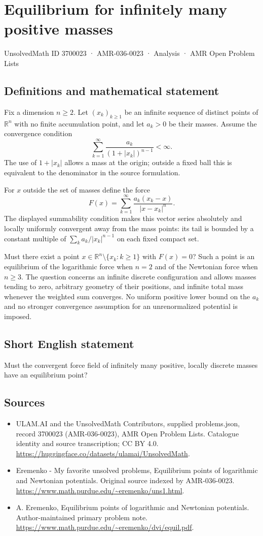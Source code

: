 \documentclass[11pt,a4paper]{article}
\begin{document}
\section*{Equilibrium for infinitely many positive masses}\label{3700023}
{\small UnsolvedMath ID 3700023 · AMR-036-0023 · Analysis · AMR Open Problem Lists}
\subsection{Definitions and mathematical statement}
Fix a dimension $n\geq2$. Let $(x_k)_{k\geq1}$ be an
infinite sequence of distinct points of $\mathbb R^n$
with no finite accumulation point, and let $a_k>0$ be
their masses. Assume the convergence condition
\[
             \sum_{k=1}^{\infty}
                    \frac{a_k}{(1+|x_k|)^{n-1}}<\infty.
\]
The use of $1+|x_k|$ allows a mass at the origin; outside
a fixed ball this is equivalent to the denominator in
the source formulation.

For $x$ outside the set of masses define the force
\[
       F(x)=\sum_{k=1}^{\infty}
                 \frac{a_k(x_k-x)}{|x-x_k|^n}.
\]
The displayed summability condition makes this vector series
absolutely and locally uniformly convergent away from the
mass points: its tail is bounded by a constant multiple
of $\sum_k a_k/|x_k|^{n-1}$ on each fixed compact set.

Must there exist a point
$x\in\mathbb R^n\setminus\{x_k:k\geq1\}$ with $F(x)=0$?
Such a point is an equilibrium of the logarithmic force
when $n=2$ and of the Newtonian force when $n\geq3$.
The question concerns an infinite discrete configuration
and allows masses tending to zero, arbitrary geometry of
their positions, and infinite total mass whenever the
weighted sum converges. No uniform positive lower bound
on the $a_k$ and no stronger convergence assumption for
an unrenormalized potential is imposed.
\subsection{Short English statement}
Must the convergent force field of infinitely many positive, locally discrete masses have an equilibrium point?
\subsection{Sources}
\begin{itemize}
\item[S1] ULAM.AI and the UnsolvedMath Contributors, supplied problems.json, record 3700023 (AMR-036-0023), AMR Open Problem Lists. Catalogue identity and source transcription; CC BY 4.0.
\url{https://huggingface.co/datasets/ulamai/UnsolvedMath}.
\item[S2] Eremenko - My favorite unsolved problems, Equilibrium points of logarithmic and Newtonian potentials. Original source indexed by AMR-036-0023.
\url{https://www.math.purdue.edu/~eremenko/uns1.html}.
\item[S3] A. Eremenko, Equilibrium points of logarithmic and Newtonian potentials. Author-maintained primary problem note.
\url{https://www.math.purdue.edu/~eremenko/dvi/equil.pdf}.
\end{itemize}
\end{document}
